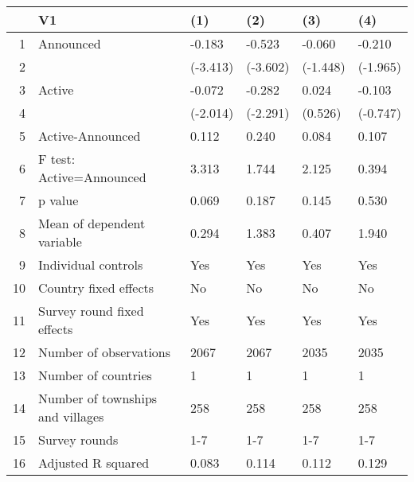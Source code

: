 \begin{table}[ht]
\centering
\begin{tabular}{rlllll}
  \hline
 & V1 & (1) & (2) & (3) & (4) \\ 
  \hline
1 & Announced & -0.183 & -0.523 & -0.060 & -0.210 \\ 
  2 &  & (-3.413) & (-3.602) & (-1.448) & (-1.965) \\ 
  3 & Active & -0.072 & -0.282 & 0.024 & -0.103 \\ 
  4 &  & (-2.014) & (-2.291) & (0.526) & (-0.747) \\ 
  5 & Active-Announced & 0.112 & 0.240 & 0.084 & 0.107 \\ 
  6 & F test: Active=Announced & 3.313 & 1.744 & 2.125 & 0.394 \\ 
  7 & p value & 0.069 & 0.187 & 0.145 & 0.530 \\ 
  8 & Mean of dependent variable & 0.294 & 1.383 & 0.407 & 1.940 \\ 
  9 & Individual controls & Yes & Yes & Yes & Yes \\ 
  10 & Country fixed effects & No & No & No & No \\ 
  11 & Survey round fixed effects & Yes & Yes & Yes & Yes \\ 
  12 & Number of observations & 2067 & 2067 & 2035 & 2035 \\ 
  13 & Number of countries & 1 & 1 & 1 & 1 \\ 
  14 & Number of townships and villages & 258 & 258 & 258 & 258 \\ 
  15 & Survey rounds & 1-7 & 1-7 & 1-7 & 1-7 \\ 
  16 & Adjusted R squared & 0.083 & 0.114 & 0.112 & 0.129 \\ 
   \hline
\end{tabular}
\end{table}
